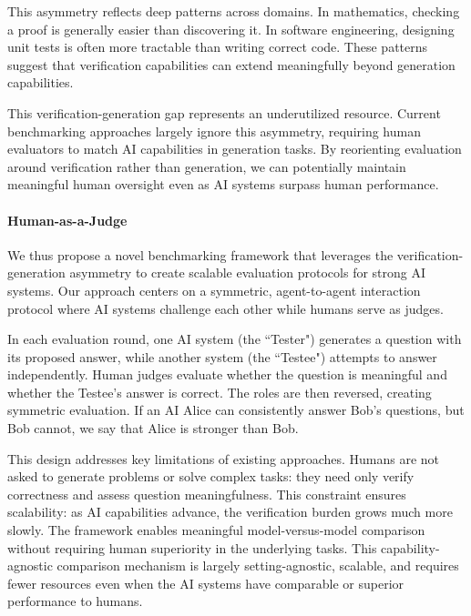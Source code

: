 \documentclass{article} %
\begin{document}
This asymmetry reflects deep patterns across domains. In mathematics, checking a proof is generally easier than discovering it. In software engineering, designing unit tests is often more tractable than writing correct code. These patterns suggest that verification capabilities can extend meaningfully beyond generation capabilities.


This verification-generation gap represents an underutilized resource. Current benchmarking approaches largely ignore this asymmetry, requiring human evaluators to match AI capabilities in generation tasks. By reorienting evaluation around verification rather than generation, we can potentially maintain meaningful human oversight even as AI systems surpass human performance.

\paragraph{Human-as-a-Judge}
We thus propose a novel benchmarking framework that leverages the verification-generation asymmetry to create scalable evaluation protocols for strong AI systems. Our approach centers on a symmetric, agent-to-agent interaction protocol where AI systems challenge each other while humans serve as judges.

In each evaluation round, one AI system (the ``Tester") generates a question with its proposed answer, while another system (the ``Testee") attempts to answer independently. Human judges evaluate whether the question is meaningful and whether the Testee's answer is correct. The roles are then reversed, creating symmetric evaluation. If an AI Alice can consistently answer Bob's questions, but Bob cannot, we say that Alice is stronger than Bob.

This design addresses key limitations of existing approaches. %
Humans are not asked to generate problems or solve complex tasks: they need only verify correctness and assess question meaningfulness. This constraint ensures scalability: as AI capabilities advance, the verification burden grows much more slowly. The framework enables meaningful model-versus-model comparison without requiring human superiority in the underlying tasks.
This capability-agnostic comparison mechanism is largely setting-agnostic, scalable, and requires fewer resources even when the AI systems have comparable or superior performance to humans.
\end{document}
